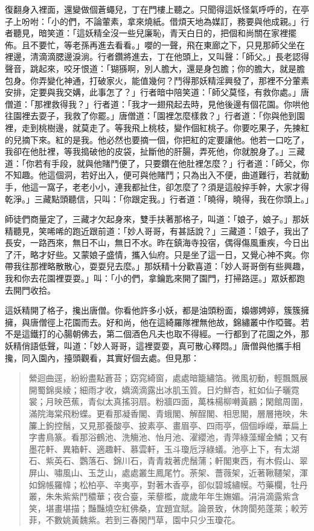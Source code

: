 復翻身入裡面，還變做個蒼蠅兒，丁在門樓上聽之。只聞得這妖怪氣呼呼的，在亭子上吩咐：「小的們，不論葷素，拿來燒紙。借煩天地為媒訂，務要與他成親。」行者聽見，暗笑道：「這妖精全沒一些兒廉恥，青天白日的，把個和尚關在家裡擺佈。且不要忙，等老孫再進去看看。」嚶的一聲，飛在東廊之下，只見那師父坐在裡邊，清滴滴腮邊淚淌。行者鑽將進去，丁在他頭上，又叫聲：「師父。」長老認得聲音，跳起來，咬牙恨道：「猢猻啊，別人膽大，還是身包膽；你的膽大，就是膽包身。你弄變化神通，打破家火，能值幾何？鬥得那妖精淫興發了，那裡不分葷素安排，定要與我交媾，此事怎了？」行者暗中陪笑道：「師父莫怪，有救你處。」唐僧道：「那裡救得我？」行者道：「我才一翅飛起去時，見他後邊有個花園。你哄他往園裡去耍子，我救了你罷。」唐僧道：「園裡怎麼樣救？」行者道：「你與他到園裡，走到桃樹邊，就莫走了。等我飛上桃枝，變作個紅桃子。你要吃果子，先揀紅的兒摘下來。紅的是我。他必然也要摘一個，你把紅的定要讓他。他若一口吃了，我卻在他肚裡，等我搗破他的皮袋，扯斷他的肝腸，弄死他，你就脫身了。」三藏道：「你若有手段，就與他賭鬥便了，只要鑽在他肚裡怎麼？」行者道：「師父，你不知趣。他這個洞，若好出入，便可與他賭鬥；只為出入不便，曲道難行，若就動手，他這一窩子，老老小小，連我都扯住，卻怎麼了？須是這般捽手幹，大家才得乾淨。」三藏點頭聽信，只叫：「你跟定我。」行者道：「曉得，曉得，我在你頭上。」

師徒們商量定了，三藏才欠起身來，雙手扶著那格子，叫道：「娘子，娘子。」那妖精聽見，笑唏唏的跑近跟前道：「妙人哥哥，有甚話說？」三藏道：「娘子，我出了長安，一路西來，無日不山，無日不水。昨在鎮海寺投宿，偶得傷風重疾，今日出了汗，略才好些。又蒙娘子盛情，攜入仙府。只是坐了這一日，又覺心神不爽。你帶我往那裡略散散心，耍耍兒去麼。」那妖精十分歡喜道：「妙人哥哥倒有些興趣，我和你去花園裡耍耍。」叫：「小的們，拿鑰匙來開了園門，打掃路逕。」眾妖都跑去開門收拾。

這妖精開了格子，攙出唐僧。你看他許多小妖，都是油頭粉面，嬝娜娉婷，簇簇擁擁，與唐僧徑上花園而去。好和尚，他在這綺羅隊裡無他故，錦繡叢中作啞聾。若不是這鐵打的心腸朝佛去，第二個酒色凡夫也取不得經。一行都到了花園之外，那妖精俏語低聲，叫道：「妙人哥哥，這裡耍耍，真可散心釋悶。」唐僧與他攜手相攙，同入園內，擡頭觀看，其實好個去處。但見那：
\begin{quote}
縈迴曲逕，紛紛盡點蒼苔；窈窕綺窗，處處暗籠繡箔。微風初動，輕飄飄展開蜀錦吳綾；細雨才收，嬌滴滴露出冰肌玉質。日灼鮮杏，紅如仙子曬霓裳；月映芭蕉，青似太真搖羽扇。粉牆四面，萬株楊柳囀黃鸝；閑館周圍，滿院海棠飛粉蝶。更看那凝香閣、青蛾閣、解酲閣、相思閣，層層捲映，朱簾上鉤控鬚，又見那養酸亭、披素亭、畫眉亭、四雨亭，個個崢嶸，華扁上字書鳥篆。看那浴鶴池、洗觴池、怡月池、濯纓池，青萍綠藻耀金鱗；又有墨花軒、異箱軒、適趣軒、慕雲軒，玉斗瓊卮浮綠蟻。池亭上下，有太湖石、紫英石、鸚落石、錦川石，青青栽著虎鬚蒲；軒閣東西，有木假山、翠屏山、嘯風山、玉芝山，處處叢生鳳尾竹。荼架、薔薇架，近著鞦韆架，渾如錦帳羅幃；松柏亭、辛夷亭，對著木香亭，卻似碧城繡幙。芍藥欄，牡丹叢，朱朱紫紫鬥穠華；夜合臺，茉藜檻，歲歲年年生嫵媚。涓涓滴露紫含笑，堪畫堪描；豔豔燒空紅佛桑，宜題宜賦。論景致，休誇閬苑蓬萊；較芳菲，不數姚黃魏紫。若到三春閑鬥草，園中只少玉瓊花。
\end{quote}

